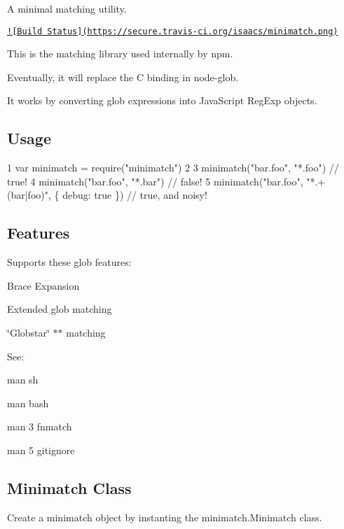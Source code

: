 A minimal matching utility.

\href{http://travis-ci.org/isaacs/minimatch}{\tt !\mbox{[}Build Status\mbox{]}(https\+://secure.\+travis-\/ci.\+org/isaacs/minimatch.\+png)}

This is the matching library used internally by npm.

Eventually, it will replace the C binding in node-\/glob.

It works by converting glob expressions into Java\+Script {\ttfamily Reg\+Exp} objects.

\subsection*{Usage}


\begin{DoxyCode}
1 var minimatch = require("minimatch")
2 
3 minimatch("bar.foo", "*.foo") // true!
4 minimatch("bar.foo", "*.bar") // false!
5 minimatch("bar.foo", "*.+(bar|foo)", \{ debug: true \}) // true, and noisy!
\end{DoxyCode}


\subsection*{Features}

Supports these glob features\+:


\begin{DoxyItemize}
\item Brace Expansion
\item Extended glob matching
\item \char`\"{}\+Globstar\char`\"{} {\ttfamily $\ast$$\ast$} matching
\end{DoxyItemize}

See\+:


\begin{DoxyItemize}
\item {\ttfamily man sh}
\item {\ttfamily man bash}
\item {\ttfamily man 3 fnmatch}
\item {\ttfamily man 5 gitignore}
\end{DoxyItemize}

\subsection*{Minimatch Class}

Create a minimatch object by instanting the {\ttfamily minimatch.\+Minimatch} class.


